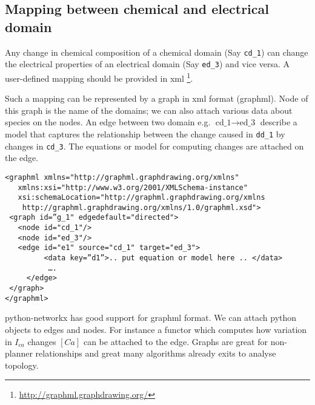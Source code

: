 \subsection{Mapping between chemical and electrical domain}

Any change in chemical composition of a chemical domain (Say \texttt{cd\_1}) can
change the electrical properties of an electrical domain (Say \texttt{ed\_3})
and vice versa. A user-defined mapping should be provided in xml 
\footnote{\url{http://graphml.graphdrawing.org/}}.


Such a mapping can be represented by a graph in xml format (graphml). Node of
this graph is the name of the domains; we can also attach various data about
species on the nodes. An edge between two domain e.g.  $\text{cd\_1}
\rightarrow \text{ed\_3}$ describe a model that captures the relationship
between the change caused in \texttt{dd\_1} by changes in \texttt{cd\_3}. The
equations or model for computing changes are attached on the edge. 

\begin{verbatim}
<graphml xmlns="http://graphml.graphdrawing.org/xmlns"  
   xmlns:xsi="http://www.w3.org/2001/XMLSchema-instance"
   xsi:schemaLocation="http://graphml.graphdrawing.org/xmlns
    http://graphml.graphdrawing.org/xmlns/1.0/graphml.xsd">
 <graph id=”g_1" edgedefault="directed">
   <node id="cd_1"/>
   <node id="ed_3"/>
   <edge id="e1" source="cd_1" target="ed_3">
         <data key=”d1”>.. put equation or model here .. </data>
          ….
     </edge>
 </graph>
</graphml>
\end{verbatim}

python-networkx has good support for graphml format. We can attach python
objects to edges and nodes. For instance a functor which computes how variation
in $I_{ca}$ changes $[Ca]$ can be attached to the edge. Graphs are great for
non-planner relationships and great many algorithms already exits to analyse
topology.



